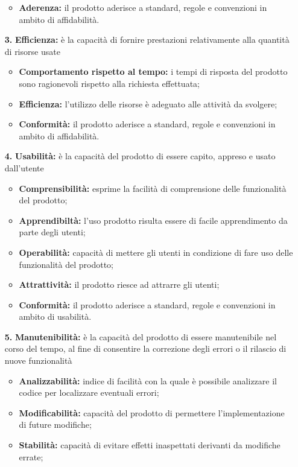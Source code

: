 \begin{itemize}
\begin{itemize}
		\item \textbf{Aderenza:} il prodotto aderisce a standard, regole e convenzioni in ambito di affidabilità.
	\end{itemize}
	\item[\textbf{3.}]\textbf{Efficienza:} è la capacità di fornire prestazioni relativamente alla quantità di risorse usate
	\begin{itemize}
		\item \textbf{Comportamento rispetto al tempo:} i tempi di risposta del prodotto sono ragionevoli rispetto alla richiesta effettuata;
		\item \textbf{Efficienza:} l'utilizzo delle risorse è adeguato alle attività da svolgere;
		\item \textbf{Conformità:} il prodotto aderisce a standard, regole e convenzioni in ambito di affidabilità.
	\end{itemize}
	\item[\textbf{4.}]\textbf{Usabilità:} è la capacità del prodotto di essere capito, appreso e usato dall'utente
	\begin{itemize}
		\item \textbf{Comprensibilità:} esprime la facilità di comprensione delle funzionalità del prodotto;
		\item \textbf{Apprendibiltà:} l'uso prodotto risulta essere di facile apprendimento da parte degli utenti;
		\item \textbf{Operabilità:} capacità di mettere gli utenti in condizione di fare uso delle funzionalità del prodotto;
		\item \textbf{Attrattività:} il prodotto riesce ad attrarre gli utenti;
		\item \textbf{Conformità:} il prodotto aderisce a standard, regole e convenzioni in ambito di usabilità.
	\end{itemize}
	\item[\textbf{5.}]\textbf{Manutenibilità:} è la capacità del prodotto di essere manutenibile nel corso del tempo, al fine di consentire la correzione degli errori o il rilascio di nuove funzionalità
	\begin{itemize}
		\item \textbf{Analizzabilità:} indice di facilità con la quale è possibile analizzare il codice per localizzare eventuali errori;
		\item \textbf{Modificabilità:} capacità del prodotto di permettere l'implementazione di future modifiche;
		\item \textbf{Stabilità:} capacità di evitare effetti inaspettati derivanti da modifiche errate;

\end{itemize}
\end{itemize}
